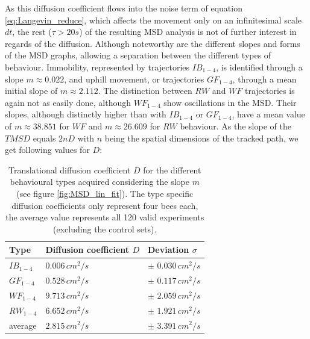 As this diffusion coefficient flows into the noise term of equation \ref{eq:Langevin_reduce}, which affects the movement only on an infinitesimal scale $dt$, the rest ($\tau > 20s$) of the resulting MSD analysis is not of further interest in regards of the diffusion. Although noteworthy are the different slopes and forms of the MSD graphs, allowing a separation between the different types of behaviour. Immobility, represented by trajectories $IB_{1-4}$, is identified through a slope $m \approx 0.022$, and uphill movement, or trajectories $GF_{1-4}$, through a mean initial slope of $m \approx 2.112$. The distinction between $RW$ and $WF$ trajectories is again not as easily done, although $WF_{1-4}$ show oscillations in the MSD. Their slopes, although distinctly higher than with $IB_{1-4}$ or $GF_{1-4}$, have a mean value of $m \approx 38.851$ for $WF$ and $m \approx 26.609$ for $RW$ behaviour. As the slope of the $TMSD$ equals $2 n D$ with $n$ being the spatial dimensions of the tracked path, we get following values for $D$:

\begin{center}
\vspace{-2mm}
\begin{table}[H]
\caption{Translational diffusion coefficient $D$ for the different behavioural types acquired considering the slope $m$ (see figure \ref{fig:MSD_lin_fit}). The type specific diffusion coefficients only represent four bees each, the average value represents all 120 valid experiments (excluding the control sets).}
    \centering
    \begin{tabular}{p{1.2cm}|p{3.8cm}|p{4.0cm}}
         \textbf{Type} & \textbf{Diffusion coefficient $D$} & \textbf{Deviation $\sigma$} \\
         \hline
         \hline
         $IB_{1-4}$ & $0.006 \,cm^{2}/s$ & $\pm$ $0.030 \,cm^{2}/s$  \\
         $GF_{1-4}$ & $0.528 \,cm^{2}/s$ & $\pm$ $0.117 \,cm^{2}/s$  \\
         $WF_{1-4}$ & $9.713 \,cm^{2}/s$ & $\pm$ $2.059 \,cm^{2}/s$  \\
         $RW_{1-4}$ & $6.652 \,cm^{2}/s$ & $\pm$ $1.921 \,cm^{2}/s$  \\
         average & $2.815 \,cm^{2}/s$ & $\pm$ $3.391 \,cm^{2}/s$ \\
    \end{tabular}
    \label{tab:D_slope}
    \vspace{-10mm}
\end{table}
\end{center}

